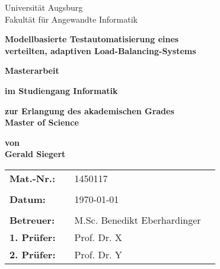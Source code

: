 \thispagestyle{empty}

\begin{center}
    {\Large{Universität Augsburg\\Fakultät für Angewandte Informatik}}
    \vspace{4\baselineskip}
    
    \begin{onehalfspace}
        \textbf{\large{Modellbasierte Testautomatisierung eines\\verteilten, adaptiven Load-Balancing-Systems}}
    \end{onehalfspace}
    \vspace{3\baselineskip}
    
    \textbf{{\Large{Masterarbeit}}}
    \vspace{1\baselineskip}
    
    \textbf{im Studiengang Informatik}
    \vspace{1\baselineskip}
    
    \textbf{zur Erlangung des akademischen Grades\\Master of Science}
    \vspace{1\baselineskip}
    
    \textbf{von\\Gerald Siegert}
    \vspace{\fill}
    
    \begin{singlespace}
        \begin{tabular}{llll}
            \textbf{Mat.-Nr.:}  &  & 1450117                      &  \\
            &  &  \\
            \textbf{Datum:}     &  & \today                       &  \\
            &  &  \\
            \textbf{Betreuer:}  &  & M.Sc. Benedikt Eberhardinger &  \\
            \textbf{1. Prüfer:} &  & Prof. Dr. X                  &  \\
            \textbf{2. Prüfer:} &  & Prof. Dr. Y                  &
        \end{tabular}
    \end{singlespace}
\end{center}
